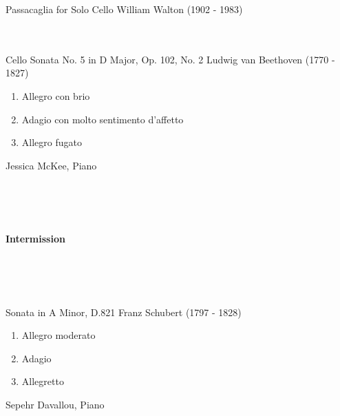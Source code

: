 \documentclass[dvipsnames]{memoir}
\begin{document}
  \Large{
    Passacaglia for Solo Cello \hfill William Walton (1902 - 1983) \\~\\~

    Cello Sonata No. 5 in D Major, Op. 102, No. 2 \hfill Ludwig van Beethoven (1770 - 1827)

    \begin{enumerate}[topsep=0em, itemsep=0em, leftmargin=1.5cm,label=\Roman*.]
      \item Allegro con brio
      \item Adagio con molto sentimento d'affetto
      \item Allegro fugato
    \end{enumerate}

    \begin{center}
     Jessica McKee, Piano
    \end{center}

    \\ ~ \\~

    \begin{center}
      \textbf{Intermission}
    \end{center}

    \\ ~ \\ ~

    Sonata in A Minor, D.821 \hfill Franz Schubert (1797 - 1828)

    \begin{enumerate}[topsep=0em, itemsep=0em, leftmargin=1.5cm,label=\Roman*.]
      \item Allegro moderato
      \item Adagio
      \item Allegretto
    \end{enumerate}

    \begin{center}
     Sepehr Davallou, Piano
    \end{center}
  }
\end{document}
